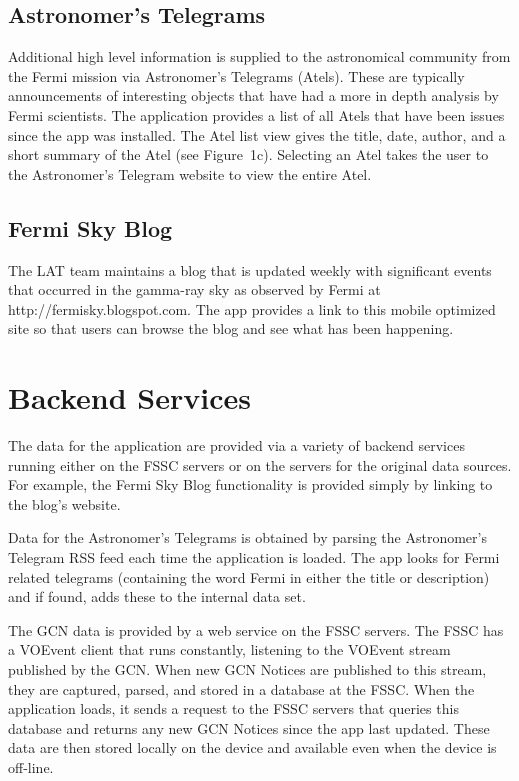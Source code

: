 \subsection{Astronomer's Telegrams}
Additional high level information is supplied to the astronomical community from the Fermi mission via Astronomer's Telegrams (Atels).  These are typically announcements of interesting objects that have had a more in depth analysis by Fermi scientists.  The application provides a list of all Atels that have been issues since the app was installed.  The Atel list view gives the title, date, author, and a short summary of the Atel (see Figure~1c).  Selecting an Atel takes the user to the Astronomer's Telegram website to view the entire Atel.

\subsection{Fermi Sky Blog}
The LAT team maintains a blog that is updated weekly with significant events that occurred in the gamma-ray sky as observed by Fermi at http://fermisky.blogspot.com.  The app provides a link to this mobile optimized site so that users can browse the blog and see what has been happening.

\section{Backend Services}
The data for the application are provided via a variety of backend services running either on the FSSC servers or on the servers for the original data sources.  For example, the Fermi Sky Blog functionality is provided simply by linking to the blog's website.

Data for the Astronomer's Telegrams is obtained by parsing the Astronomer's Telegram RSS feed each time the application is loaded.  The app looks for Fermi related telegrams (containing the word Fermi in either the title or description) and if found, adds these to the internal data set.

The GCN data is provided by a web service on the FSSC servers.  The FSSC has a VOEvent client that runs constantly, listening to the VOEvent stream published by the GCN.  When new GCN Notices are published to this stream, they are captured, parsed, and stored in a database at the FSSC.  When the application loads, it sends a request to the FSSC servers that queries this database and returns any new GCN Notices since the app last updated.  These data are then stored locally on the device and available even when the device is off-line.

